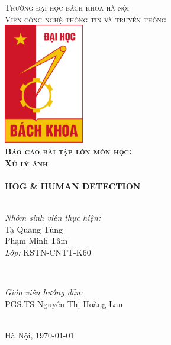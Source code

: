 \documentclass[../report.tex]{subfiles}
\begin{document}
\begin{titlepage}

\center
 
\textsc{\Huge Trường đại học bách khoa hà nội}\\[3mm] %
\textsc{\LARGE Viện công nghệ thông tin và truyền thông}\\[1cm] %
\includegraphics[width=3.5cm]{figures/hust.jpg}\\[1cm] %
 
\textsc{\LARGE\bfseries Báo cáo bài tập lớn môn học:} \\[0.2cm]
\textsc{\huge\bfseries Xử lý ảnh}\\[1cm] %

\HRule \\[5mm]
{\Huge\bfseries HOG \& HUMAN DETECTION}\\[2mm] %
\HRule \\[1.5cm]

\begin{minipage}{0.4\textwidth}
\begin{flushleft} \large
\emph{Nhóm sinh viên thực hiện:}\\
Tạ Quang Tùng \\ 
Phạm Minh Tâm \\
\emph{Lớp:} KSTN-CNTT-K60
\end{flushleft}
\end{minipage}
~
\begin{minipage}{0.4\textwidth}
\begin{flushright} \large
\emph{Giáo viên hướng dẫn:} \\
PGS.TS Nguyễn Thị Hoàng Lan
\end{flushright}
\end{minipage}\\[5cm]

{\large Hà Nội, \today}\\[1cm] %

\vfill %

\end{titlepage}
\end{document}

